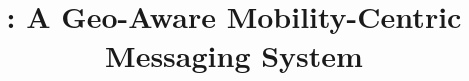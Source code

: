 \documentclass[letterpaper,twocolumn,10pt]{sig-alternate-10pt}
\title{\name: A Geo-Aware Mobility-Centric Messaging System}
\begin{document}
\maketitle










%


{
  \small 
  
  
}
\end{document}
